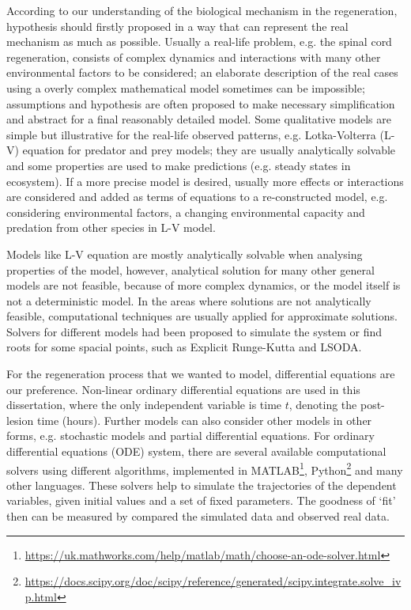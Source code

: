 According to our understanding of the biological mechanism in the regeneration, hypothesis should firstly proposed in a way that can represent the real  mechanism as much as possible. Usually a real-life problem, e.g. the spinal cord regeneration, consists of complex dynamics and interactions with many other environmental factors to be considered; an elaborate description of the real cases using a overly complex mathematical model sometimes can be impossible; assumptions and hypothesis are often proposed to make necessary simplification and abstract for a final reasonably detailed model. Some qualitative models are simple but illustrative for the real-life observed patterns, e.g. Lotka-Volterra (L-V) equation for predator and prey models; they are usually analytically solvable and some properties are used to make predictions (e.g. steady states in ecosystem). If a more precise model is desired, usually more effects or interactions are considered and added as terms of equations to a re-constructed model, e.g. considering environmental factors, a changing environmental capacity and predation from other species in L-V model.

Models like L-V equation are mostly analytically solvable when analysing properties of the model, however, analytical solution for many other general models are not feasible, because of more complex dynamics, or the model itself is not a deterministic model. In the areas where solutions are not analytically feasible, computational techniques are usually applied for approximate solutions. Solvers for different models had been proposed to simulate the system or find roots for some spacial points, such as Explicit Runge-Kutta \cite{dormand1980family} and LSODA.

For the regeneration process that we wanted to model, differential equations are our preference. Non-linear ordinary differential equations are used in this dissertation, where the only independent variable is time $t$, denoting the post-lesion time (hours). Further models can also consider other models in other forms, e.g. stochastic models and partial differential equations. For ordinary differential equations (ODE) system, there are several available computational solvers using different algorithms, implemented in MATLAB\footnote[1] {\url{https://uk.mathworks.com/help/matlab/math/choose-an-ode-solver.html}}, Python\footnote[2]{\url{https://docs.scipy.org/doc/scipy/reference/generated/scipy.integrate.solve_ivp.html}} and many other languages. These solvers help to simulate the trajectories of the dependent variables, given initial values and a set of fixed parameters. The goodness of `fit' then can be measured by compared the simulated data and observed real data.

